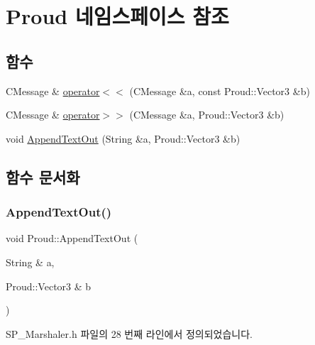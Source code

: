 \hypertarget{namespace_proud}{}\section{Proud 네임스페이스 참조}
\label{namespace_proud}
\subsection*{함수}
\begin{DoxyCompactItemize}
\item 
C\+Message \& \hyperlink{namespace_proud_aa1fd229f7228be16966e4508ed9c2a2b}{operator$<$$<$} (C\+Message \&a, const Proud\+::\+Vector3 \&b)
\item 
C\+Message \& \hyperlink{namespace_proud_a822c4aed58c18f332db22ab629174841}{operator$>$$>$} (C\+Message \&a, Proud\+::\+Vector3 \&b)
\item 
void \hyperlink{namespace_proud_a7ff9835da372ae816e45a4e4aa8ad9e3}{Append\+Text\+Out} (String \&a, Proud\+::\+Vector3 \&b)
\end{DoxyCompactItemize}


\subsection{함수 문서화}
\mbox{\label{namespace_proud_a7ff9835da372ae816e45a4e4aa8ad9e3}} 
\subsubsection{\texorpdfstring{Append\+Text\+Out()}{AppendTextOut()}}
{\footnotesize\ttfamily void Proud\+::\+Append\+Text\+Out (\begin{DoxyParamCaption}\item[{String \&}]{a,  }\item[{Proud\+::\+Vector3 \&}]{b }\end{DoxyParamCaption})\hspace{0.3cm}{\ttfamily [inline]}}



S\+P\+\_\+\+Marshaler.\+h 파일의 28 번째 라인에서 정의되었습니다.


\mbox{\label{namespace_proud_aa1fd229f7228be16966e4508ed9c2a2b}} 
